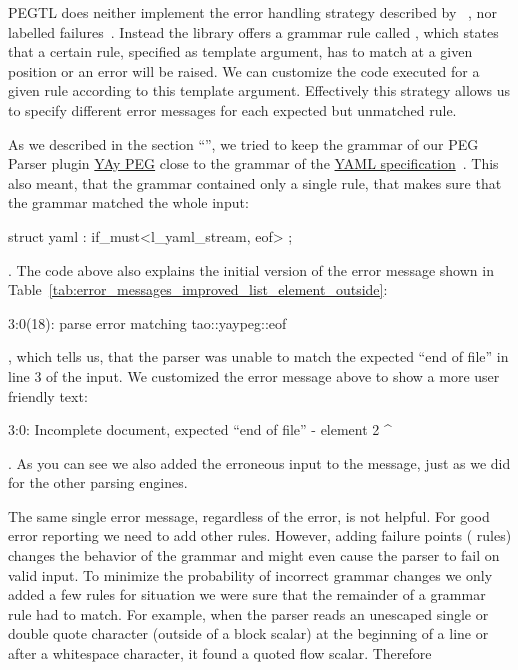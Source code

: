PEGTL does neither implement the error handling strategy described by \citeauthor{ford2002packrat}~\cite{ford2002packrat}, nor labelled failures~\cite{maidl2016129}. Instead the library offers a grammar rule called , which states that a certain rule, specified as template argument, has to match at a given position or an error will be raised. We can customize the code executed for a given  rule according to this template argument. Effectively this strategy allows us to specify different error messages for each expected but unmatched rule.

As we described in the section “”, we tried to keep the grammar of our PEG Parser plugin \href{https://libelektra.org/plugins/yaypeg}{YAy PEG} close to the grammar of the \href{http://yaml.org/spec/1.2/spec}{YAML specification}~\cite{ben2009yaml}. This also meant, that the grammar contained only a single  rule, that makes sure that the grammar matched the whole input:

\begin{cppcode}
  struct yaml : if_must<l_yaml_stream, eof> {};
\end{cppcode}

. The code above also explains the initial version of the error message shown in Table~\ref{tab:error_messages_improved_list_element_outside}:

\begin{textcode}
  3:0(18): parse error matching tao::yaypeg::eof
\end{textcode}

, which tells us, that the parser was unable to match the expected “end of file” in line 3 of the input. We customized the error message above to show a more user friendly text:

\begin{textcode}
  3:0: Incomplete document, expected “end of file”
       - element 2
       ^
\end{textcode}

. As you can see we also added the erroneous input to the message, just as we did for the other parsing engines.

The same single error message, regardless of the error, is not helpful. For good error reporting we need to add other  rules. However, adding failure points ( rules) changes the behavior of the grammar and might even cause the parser to fail on valid input. To minimize the probability of incorrect grammar changes we only added a few rules for situation we were sure that the remainder of a grammar rule had to match. For example, when the parser reads an unescaped single or double quote character (outside of a block scalar) at the beginning of a line or after a whitespace character, it found a quoted flow scalar. Therefore

